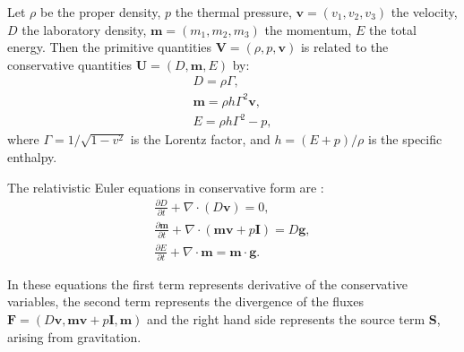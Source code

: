 Let $\rho$ be the proper density, $p$ the thermal pressure, $\textbf{v} =( v_1, v_2, v_3)$ the velocity, $D$ the laboratory density, $\textbf{m} = (m_1, m_2, m_3)$ the momentum, $E$ the total energy. Then the primitive quantities $\textbf{V} = (\rho, p, \textbf{v})$ is related to the conservative quantities $\textbf{U} = (D, \textbf{m}, E)$ by:
\begin{eqnarray}
D = \rho \Gamma, \nonumber \\  
\textbf{m} = \rho h \Gamma^2 \textbf{v}, \\
E = \rho h \Gamma^2 -p \nonumber,
\end{eqnarray}
where $\Gamma = 1/\sqrt{1 - v^2}$ is the Lorentz factor, and $h = (E+p)/\rho$ is the specific enthalpy.

The relativistic Euler equations in conservative form are  \citep{pluto12}:
\begin{eqnarray}
\frac{\partial D}{\partial t} +  \nabla \cdot (D\textbf{v})= 0  \label{eq:d},\\
\frac{\partial \textbf{m}}{\partial t} + \nabla \cdot (\textbf{m}\textbf{v} + p\textbf{I}) = D\textbf{g},  \label{eq:m}\\
\frac{\partial E}{\partial t} + \nabla \cdot \textbf{m}  = \textbf{m} \cdot \textbf{g}. \label{eq:e}
\end{eqnarray}

In these equations the first term represents derivative of the conservative variables, the second term represents the divergence of the fluxes $\textbf{F} =(D \textbf{v}, \textbf{mv}+ p\textbf{I}, \textbf{m})$ and the right hand side represents the source term \textbf{S}, arising from gravitation. 


